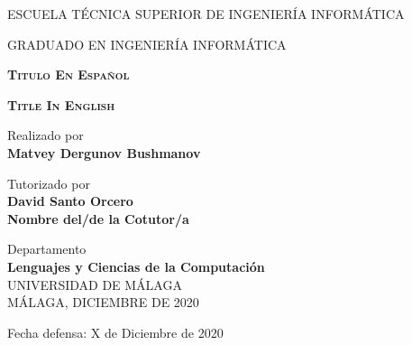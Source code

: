 \begin{titlepage}
    \selectfont
    
    \begin{center}
        {\large ESCUELA TÉCNICA SUPERIOR DE INGENIERÍA INFORMÁTICA}

        \vspace{0.1cm}
        {\large GRADUADO EN INGENIERÍA INFORMÁTICA}

        \vspace{2cm}
        \Large
        \textbf{\textsc{Titulo En Español}}
        \vspace{1cm}
        
        \Large
        \textbf{\textsc{Title In English}}

        \vspace{2cm}
        \large
        Realizado por\\
        \textbf{Matvey Dergunov Bushmanov}

        \vspace{1cm}
        \large
        Tutorizado por\\
        \textbf{David Santo Orcero\\
        Nombre del/de la Cotutor/a}

        \vspace{1cm}
        \large
        Departamento\\
        \textbf{Lenguajes y Ciencias de la Computación}\\

        \vspace{2cm}
        \large
        UNIVERSIDAD DE MÁLAGA
        \\
        MÁLAGA, DICIEMBRE DE 2020
    \end{center}
    \begin{flushright}
        \vspace{1.5cm}
        Fecha defensa: X de Diciembre de 2020
    \end{flushright}
\end{titlepage}

\begingroup
    \pagestyle{empty}
    \cleardoublepage
\endgroup
